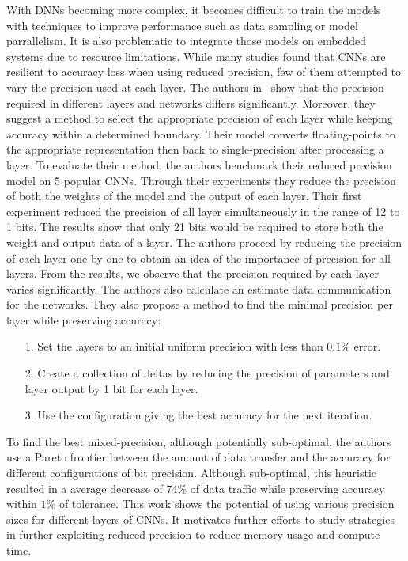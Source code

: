 With DNNs becoming more complex, it becomes difficult to train the models with 
techniques to improve performance such as data sampling or model parrallelism.
It is also problematic to integrate those models on embedded systems due to resource limitations.
While many studies found that CNNs are resilient to accuracy loss when using reduced precision,
few of them attempted to vary the precision used at each layer.
The authors in~\cite{Judd2015-kw} show that the precision required in different layers and networks
differs significantly.
Moreover, they suggest a method to select the appropriate precision of each layer while 
keeping accuracy within a determined boundary.
Their model converts floating-points to the appropriate representation then back to single-precision after processing a layer.
To evaluate their method, the authors benchmark their reduced precision model on 5 popular CNNs.
Through their experiments they reduce the precision of both the weights of the model and the output of each layer.
Their first experiment reduced the precision of all layer simultaneously in the range of 12 to 1 bits.
The results show that only 21 bits would be required to store both the weight and output data of a layer.
The authors proceed by reducing the precision of each layer one by one to obtain an idea of the importance of precision for all layers.
From the results, we observe that the precision required by each layer varies significantly.
The authors also calculate an estimate data communication for the networks.
They also propose a method to find the minimal precision per layer while preserving accuracy:
\begin{itemize}
	\item[1.] Set the layers to an initial uniform precision with less than $0.1\%$ error.
	\item[2.] Create a collection of deltas by reducing the precision of parameters and layer output by 1 bit for each layer.
	\item[3.] Use the configuration giving the best accuracy for the next iteration.
\end{itemize}
To find the best mixed-precision, although potentially sub-optimal, the authors use a Pareto
frontier between the amount of data transfer and the accuracy for different configurations of bit precision.
Although sub-optimal, this heuristic resulted in a average decrease of $74\%$ of data traffic
while preserving accuracy within $1\%$ of tolerance.
This work shows the potential of using various precision sizes for different layers of CNNs.
It motivates further efforts to study strategies in further exploiting reduced precision
to reduce memory usage and compute time. 

